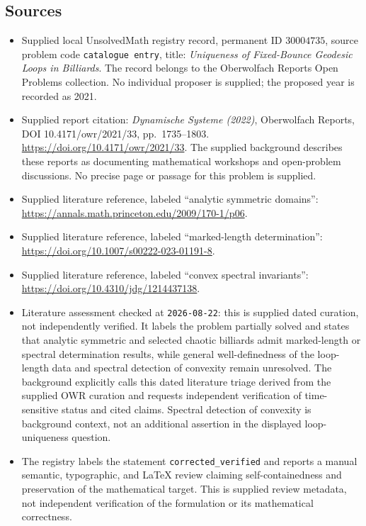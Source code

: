 \documentclass[11pt]{article}
\begin{document}
\subsection{Sources}
\begin{itemize}
\item Supplied local UnsolvedMath registry record, permanent ID \(30004735\), source problem code \texttt{catalogue entry}, title: \emph{Uniqueness of Fixed-Bounce Geodesic Loops in Billiards}. The record belongs to the Oberwolfach Reports Open Problems collection. No individual proposer is supplied; the proposed year is recorded as 2021.
\item Supplied report citation: \emph{Dynamische Systeme (2022)}, Oberwolfach Reports, DOI 10.4171/owr/2021/33, pp.\ 1735--1803. \url{https://doi.org/10.4171/owr/2021/33}. The supplied background describes these reports as documenting mathematical workshops and open-problem discussions. No precise page or passage for this problem is supplied.
\item Supplied literature reference, labeled ``analytic symmetric domains'': \url{https://annals.math.princeton.edu/2009/170-1/p06}.
\item Supplied literature reference, labeled ``marked-length determination'': \url{https://doi.org/10.1007/s00222-023-01191-8}.
\item Supplied literature reference, labeled ``convex spectral invariants'': \url{https://doi.org/10.4310/jdg/1214437138}.
\item Literature assessment checked at \texttt{2026-08-22}: this is supplied dated curation, not independently verified. It labels the problem partially solved and states that analytic symmetric and selected chaotic billiards admit marked-length or spectral determination results, while general well-definedness of the loop-length data and spectral detection of convexity remain unresolved. The background explicitly calls this dated literature triage derived from the supplied OWR curation and requests independent verification of time-sensitive status and cited claims. Spectral detection of convexity is background context, not an additional assertion in the displayed loop-uniqueness question.
\item The registry labels the statement \texttt{corrected\_verified} and reports a manual semantic, typographic, and LaTeX review claiming self-containedness and preservation of the mathematical target. This is supplied review metadata, not independent verification of the formulation or its mathematical correctness.
\end{itemize}
\end{document}
